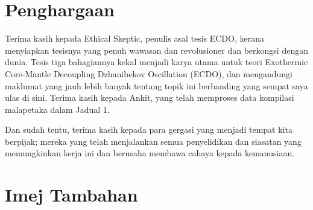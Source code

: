 \documentclass[10pt,twocolumn,letterpaper]{article}
\begin{document}
\section{Penghargaan}

Terima kasih kepada Ethical Skeptic, penulis asal tesis ECDO, kerana menyiapkan tesisnya yang penuh wawasan dan revolusioner dan berkongsi dengan dunia. Tesis tiga bahagiannya \cite{1} kekal menjadi karya utama untuk teori Exothermic Core-Mantle Decoupling Dzhanibekov Oscillation (ECDO), dan mengandungi maklumat yang jauh lebih banyak tentang topik ini berbanding yang sempat saya ulas di sini.
Terima kasih kepada Ankit, yang telah memproses data kompilasi malapetaka dalam Jadual 1.

Dan sudah tentu, terima kasih kepada para gergasi yang menjadi tempat kita berpijak; mereka yang telah menjalankan semua penyelidikan dan siasatan yang memungkinkan kerja ini dan berusaha membawa cahaya kepada kemanusiaan.

\clearpage
\twocolumn

\section{Imej Tambahan}
\end{document}
